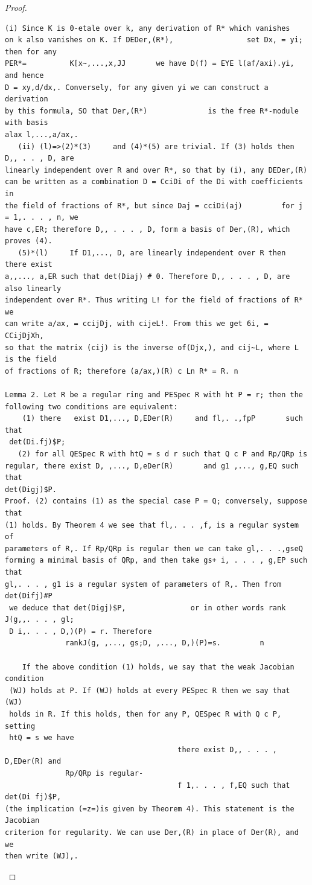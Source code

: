 \begin{proof}
\begin{verbatim}
(i) Since K is 0-etale over k, any derivation of R* which vanishes
on k also vanishes on K. If DEDer,(R*),                 set Dx, = yi; then for any
PER*=          K[x~,...,x,JJ       we have D(f) = EYE l(af/axi).yi,      and hence
D = xy,d/dx,. Conversely, for any given yi we can construct a derivation
by this formula, SO that Der,(R*)              is the free R*-module     with basis
alax l,...,a/ax,.
   (ii) (l)=>(2)*(3)     and (4)*(5) are trivial. If (3) holds then D,, . . , D, are
linearly independent over R and over R*, so that by (i), any DEDer,(R)
can be written as a combination D = CciDi of the Di with coefficients in
the field of fractions of R*, but since Daj = cciDi(aj)         for j = 1,. . . , n, we
have c,ER; therefore D,, . . . , D, form a basis of Der,(R), which proves (4).
   (5)*(l)     If D1,..., D, are linearly independent over R then there exist
a,,..., a,ER such that det(Diaj) # 0. Therefore D,, . . . , D, are also linearly
independent over R*. Thus writing L! for the field of fractions of R* we
can write a/ax, = ccijDj, with cijeL!. From this we get 6i, = CCijDjXh,
so that the matrix (cij) is the inverse of(Djx,), and cij~L, where L is the field
of fractions of R; therefore (a/ax,)(R) c Ln R* = R. n

Lemma 2. Let R be a regular ring and PESpec R with ht P = r; then the
following two conditions are equivalent:
    (1) there   exist D1,..., D,EDer(R)     and fl,. .,fpP       such that
 det(Di.fj)$P;
   (2) for all QESpec R with htQ = s d r such that Q c P and Rp/QRp is
regular, there exist D, ,..., D,eDer(R)       and g1 ,..., g,EQ such that
det(Digj)$P.
Proof. (2) contains (1) as the special case P = Q; conversely, suppose that
(1) holds. By Theorem 4 we see that fl,. . . ,f, is a regular system of
parameters of R,. If Rp/QRp is regular then we can take gl,. . .,gseQ
forming a minimal basis of QRp, and then take gs+ i, . . . , g,EP such that
gl,. . . , g1 is a regular system of parameters of R,. Then from det(Difj)#P
 we deduce that det(Digj)$P,               or in other words rank J(g,,. . . , gl;
 D i,. . . , D,)(P) = r. Therefore
              rankJ(g, ,..., gs;D, ,..., D,)(P)=s.         n

    If the above condition (1) holds, we say that the weak Jacobian condition
 (WJ) holds at P. If (WJ) holds at every PESpec R then we say that (WJ)
 holds in R. If this holds, then for any P, QESpec R with Q c P, setting
 htQ = s we have
                                        there exist D,, . . . , D,EDer(R) and
              Rp/QRp is regular-
                                        f 1,. . . , f,EQ such that det(Di fj)$P,
(the implication (=z=)is given by Theorem 4). This statement is the Jacobian
criterion for regularity. We can use Der,(R) in place of Der(R), and we
then write (WJ),.
\end{verbatim}
\end{proof}


